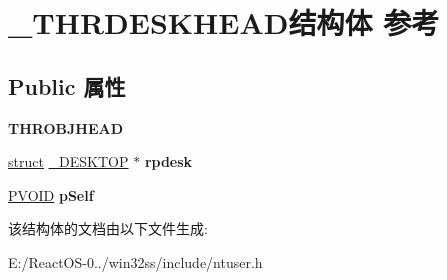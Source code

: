 \hypertarget{struct___t_h_r_d_e_s_k_h_e_a_d}{}\section{\+\_\+\+T\+H\+R\+D\+E\+S\+K\+H\+E\+A\+D结构体 参考}
\label{struct___t_h_r_d_e_s_k_h_e_a_d}
\subsection*{Public 属性}
\begin{DoxyCompactItemize}
\item 
\mbox{\label{struct___t_h_r_d_e_s_k_h_e_a_d_a57a81a855508bec9cb98428637ecc125}} 
{\bfseries T\+H\+R\+O\+B\+J\+H\+E\+AD}
\item 
\mbox{\label{struct___t_h_r_d_e_s_k_h_e_a_d_a98bb56171ba75d80492c3c76a178608c}} 
\hyperlink{interfacestruct}{struct} \hyperlink{struct___d_e_s_k_t_o_p}{\+\_\+\+D\+E\+S\+K\+T\+OP} $\ast$ {\bfseries rpdesk}
\item 
\mbox{\label{struct___t_h_r_d_e_s_k_h_e_a_d_af9d50abfe7fca736db283efd6a568130}} 
\hyperlink{interfacevoid}{P\+V\+O\+ID} {\bfseries p\+Self}
\end{DoxyCompactItemize}


该结构体的文档由以下文件生成\+:\begin{DoxyCompactItemize}
\item 
E\+:/\+React\+O\+S-\/0../win32ss/include/ntuser.\+h\end{DoxyCompactItemize}
